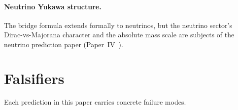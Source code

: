 \documentclass[11pt]{article}
\theoremstyle{remark}
\begin{document}
\paragraph{Neutrino Yukawa structure.}
The bridge formula extends formally to neutrinos, but the
neutrino sector's Dirac-vs-Majorana character and the
absolute mass scale are subjects of the neutrino prediction
paper (Paper~IV~\cite{neutrinos}).

\section{Falsifiers}
\label{sec:falsifiers}

Each prediction in this paper carries concrete failure modes.
\end{document}
